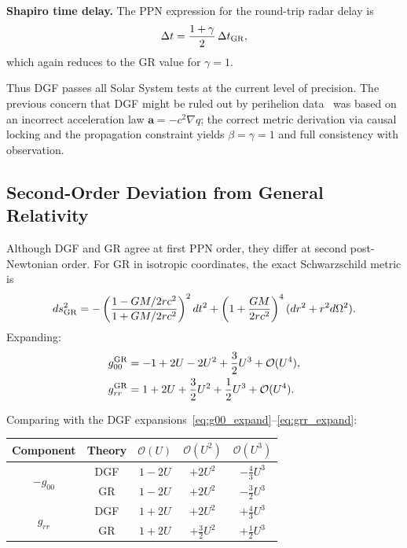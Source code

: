 \textbf{Shapiro time delay.}
The PPN expression for the round-trip radar delay is
\begin{equation}
\Delta t = \frac{1+\gamma}{2}\,\Delta t_{\rm GR},
\end{equation}
which again reduces to the GR value for $\gamma=1$.

Thus DGF passes all Solar System tests at the current level of precision.
The previous concern that DGF might be ruled out by perihelion data~\cite{...} was based on an incorrect acceleration law $\mathbf{a}=-c^2\nabla q$; the correct metric derivation via causal locking and the propagation constraint yields $\beta=\gamma=1$ and full consistency with observation.

\subsection{Second-Order Deviation from General Relativity}

Although DGF and GR agree at first PPN order, they differ at second post-Newtonian order.
For GR in isotropic coordinates, the exact Schwarzschild metric is~\cite{MTW:1973}
\begin{equation}
ds^2_{\rm GR} = -\left(\frac{1-GM/2rc^2}{1+GM/2rc^2}\right)^2 dt^2 + \left(1+\frac{GM}{2rc^2}\right)^4 (dr^2 + r^2d\Omega^2).
\end{equation}
Expanding:
\begin{align}
g_{00}^{\rm GR} &= -1 + 2U - 2U^2 + \frac{3}{2}U^3 + \mathcal{O}(U^4), \label{eq:gr_g00} \\
g_{rr}^{\rm GR} &= 1 + 2U + \frac{3}{2}U^2 + \frac{1}{2}U^3 + \mathcal{O}(U^4). \label{eq:gr_grr}
\end{align}

Comparing with the DGF expansions~\eqref{eq:g00_expand}--\eqref{eq:grr_expand}:

\begin{center}
\begin{tabular}{c|cccc}
\toprule
Component & Theory & $\mathcal{O}(U)$ & $\mathcal{O}(U^2)$ & $\mathcal{O}(U^3)$ \\
\midrule
\multirow{2}{*}{$-g_{00}$} & DGF & $1-2U$ & $+2U^2$ & $-\frac{4}{3}U^3$ \\
                            & GR  & $1-2U$ & $+2U^2$ & $-\frac{3}{2}U^3$ \\
\midrule
\multirow{2}{*}{$g_{rr}$}   & DGF & $1+2U$ & $+2U^2$ & $+\frac{4}{3}U^3$ \\
                            & GR  & $1+2U$ & $+\frac{3}{2}U^2$ & $+\frac{1}{2}U^3$ \\
\bottomrule
\end{tabular}
\end{center}

